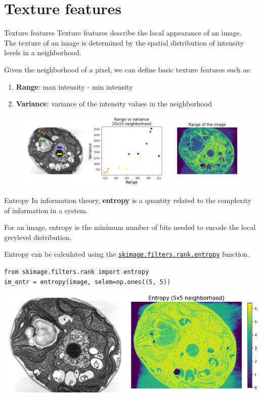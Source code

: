 \documentclass[9pt, aspectratio=169]{beamer}
\begin{document}
\section{Texture features}

\begin{frame}
    {Texture features}
    Texture features describe the local appearance of an image.\\

    The texture of an image is determined by the spatial distribution of intensity levels in a neighborhood.

    Given the neighborhood of a pixel, we can define basic texture features such as:

    \begin{enumerate}
        \item \textbf{Range}: max intensity - min intensity
        \item \textbf{Variance}: variance of the intensity values in the neighborhood
    \end{enumerate}
    \pause

    \centering
    \begin{figure}
        \includegraphics[width=.8\textwidth]{texture_features_range_var.png}
        \caption{\small{\color{gray}{TEM image of a Chlamydomonas green algae - CC0, Dartmouth College}\color{black}}}
    \end{figure}
\end{frame}

\begin{frame}
    {Entropy}
    In information theory, \textbf{entropy} is a quantity related to the complexity of information in a system.

    For an image, entropy is the minimum number of bits needed to encode the local greylevel distribution.

    Entropy can be calculated using the \href{https://scikit-image.org/docs/dev/api/skimage.filters.rank.html\#skimage.filters.rank.entropy}{\texttt{\underline{skimage.filters.rank.entropy}}} function.

    \begin{codebox}
        \texttt{from skimage.filters.rank import entropy\\
            im\_entr = entropy(image, selem=np.ones((5, 5))}
    \end{codebox}
    \centering
    \includegraphics[width=.75\textwidth]{entropy.png}
\end{frame}
\end{document}
